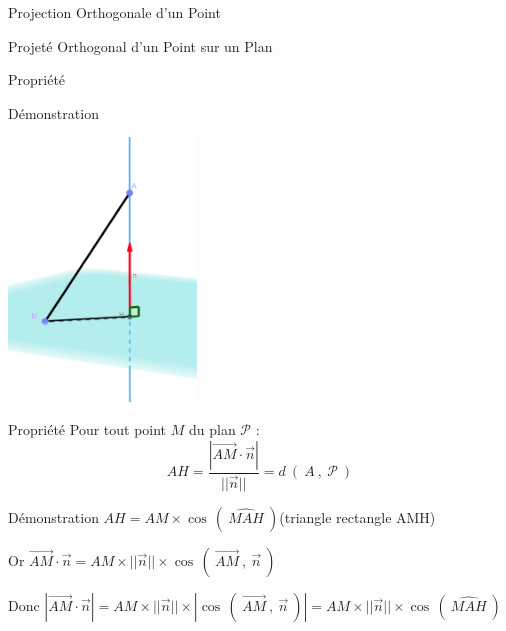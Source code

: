 \documentclass{coursbook}
\begin{document}
\begin{Gpartie}{Projection Orthogonale d'un Point}
\begin{Spartie}{Projeté Orthogonal d'un Point sur un Plan}
\begin{SSSpartie}{Propriété}
\begin{SSSSpartie}{Démonstration}
                    \begin{center}
                        \includegraphics[width=5cm]{rsc/12fig9.png}
                        \parbox{\linewidth}{}
                    \end{center}    
                \end{SSSSpartie}
            \end{SSSpartie}
            \begin{SSSpartie}{Propriété} 
                Pour tout point $M$ du plan $\mathcal{P}$ : \[AH=\frac{\left\lvert\overrightarrow{AM}\cdot\vec{n}\right\rvert}{\lvert\lvert\vec{n}\rvert\rvert}=d~\left(~A~,~\mathcal{P}~\right)\]
                \begin{SSSSpartie}{Démonstration} 
                    $AH=AM\times\cos\,\left(~\widehat{MAH}~\right)$\quad (triangle rectangle AMH)

                    Or $\overrightarrow{AM}\cdot\vec{n}=AM\times\lvert\lvert\vec{n}\rvert\rvert\times\cos\,\left(~\overrightarrow{AM}~,~\vec{n}~\right)$

                    Donc $\left\lvert\overrightarrow{AM}\cdot\vec{n}\right\rvert=AM\times\lvert\lvert\vec{n}\rvert\rvert\times\left\lvert\cos\,\left(~\overrightarrow{AM}~,~\vec{n}~\right)\right\rvert=AM\times\lvert\lvert\vec{n}\rvert\rvert\times\cos\,\left(~\widehat{MAH}~\right)$


\end{SSSSpartie}
\end{SSSpartie}
\end{Spartie}
\end{Gpartie}
\end{document}
